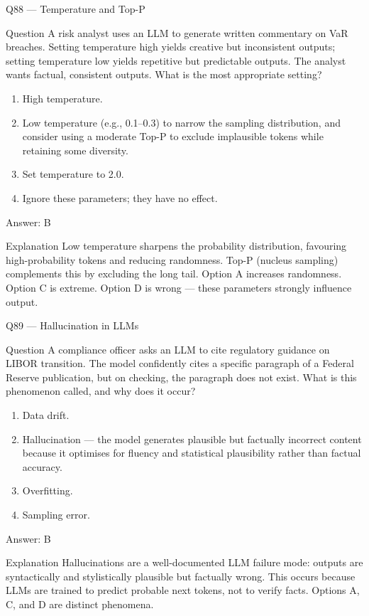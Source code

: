 \documentclass[aspectratio=169,8pt]{beamer}
\begin{document}
\begin{frame}{Q88 --- Temperature and Top-P}
\begin{block}{Question}
A risk analyst uses an LLM to generate written commentary on VaR breaches. Setting temperature high yields creative but inconsistent outputs; setting temperature low yields repetitive but predictable outputs. The analyst wants factual, consistent outputs. What is the most appropriate setting?
\end{block}
\begin{enumerate}
\item High temperature.
\item Low temperature (e.g., 0.1--0.3) to narrow the sampling distribution, and consider using a moderate Top-P to exclude implausible tokens while retaining some diversity.
\item Set temperature to 2.0.
\item Ignore these parameters; they have no effect.
\end{enumerate}
\begin{exampleblock}{Answer: B}\end{exampleblock}
\begin{block}{Explanation}
Low temperature sharpens the probability distribution, favouring high-probability tokens and reducing randomness. Top-P (nucleus sampling) complements this by excluding the long tail. Option A increases randomness. Option C is extreme. Option D is wrong --- these parameters strongly influence output.
\end{block}
\end{frame}

\begin{frame}{Q89 --- Hallucination in LLMs}
\begin{block}{Question}
A compliance officer asks an LLM to cite regulatory guidance on LIBOR transition. The model confidently cites a specific paragraph of a Federal Reserve publication, but on checking, the paragraph does not exist. What is this phenomenon called, and why does it occur?
\end{block}
\begin{enumerate}
\item Data drift.
\item Hallucination --- the model generates plausible but factually incorrect content because it optimises for fluency and statistical plausibility rather than factual accuracy.
\item Overfitting.
\item Sampling error.
\end{enumerate}
\begin{exampleblock}{Answer: B}\end{exampleblock}
\begin{block}{Explanation}
Hallucinations are a well-documented LLM failure mode: outputs are syntactically and stylistically plausible but factually wrong. This occurs because LLMs are trained to predict probable next tokens, not to verify facts. Options A, C, and D are distinct phenomena.
\end{block}
\end{frame}
\end{document}
